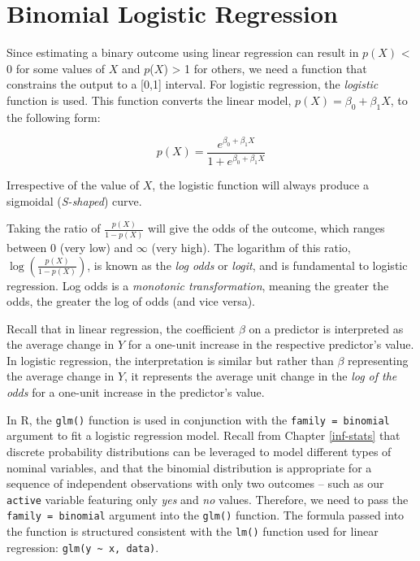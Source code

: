 \documentclass[
]{book}
\begin{document}
\hypertarget{binomial-logistic-regression}{%
\section{Binomial Logistic Regression}\label{binomial-logistic-regression}}

Since estimating a binary outcome using linear regression can result in \(p(X)\) \textless{} 0 for some values of \(X\) and \(p\)(\(X\)) \textgreater{} 1 for others, we need a function that constrains the output to a {[}0,1{]} interval. For logistic regression, the \emph{logistic} function is used. This function converts the linear model, \(p(X) = \beta_0 + \beta_1 X\), to the following form:

\[ p(X) = \frac{e^{\beta_0 + \beta_1 X}}{1+e^{\beta_0 + \beta_1 X}} \]

Irrespective of the value of \(X\), the logistic function will always produce a sigmoidal (\emph{S-shaped}) curve.

Taking the ratio of \(\frac {p(X)}{1 - p(X)}\) will give the odds of the outcome, which ranges between 0 (very low) and \(\infty\) (very high). The logarithm of this ratio, \(\log(\frac {p(X)}{1 - p(X)})\), is known as the \emph{log odds} or \emph{logit}, and is fundamental to logistic regression. Log odds is a \emph{monotonic transformation}, meaning the greater the odds, the greater the log of odds (and vice versa).

Recall that in linear regression, the coefficient \(\beta\) on a predictor is interpreted as the average change in \(Y\) for a one-unit increase in the respective predictor's value. In logistic regression, the interpretation is similar but rather than \(\beta\) representing the average change in \(Y\), it represents the average unit change in the \emph{log of the odds} for a one-unit increase in the predictor's value.

In R, the \texttt{glm()} function is used in conjunction with the \texttt{family\ =\ binomial} argument to fit a logistic regression model. Recall from Chapter \ref{inf-stats} that discrete probability distributions can be leveraged to model different types of nominal variables, and that the binomial distribution is appropriate for a sequence of independent observations with only two outcomes -- such as our \texttt{active} variable featuring only \emph{yes} and \emph{no} values. Therefore, we need to pass the \texttt{family\ =\ binomial} argument into the \texttt{glm()} function. The formula passed into the function is structured consistent with the \texttt{lm()} function used for linear regression: \texttt{glm(y\ \textasciitilde{}\ x,\ data)}.
\end{document}

